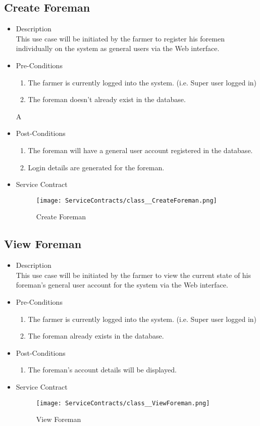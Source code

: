 \documentclass[11pt,fleqn]{book} %
\begin{document}
\subsection{Create Foreman}
\begin{itemize}
	\item Description\\
	This use case will be initiated by the farmer to register his foremen individually on the system as general users via the Web interface.
	\item Pre-Conditions
	\begin{enumerate}
		\item The farmer is currently logged into the system. (i.e. Super user logged in)
		\item The foreman doesn’t already exist in the database.
	\end{enumerate}A
	\item Post-Conditions
	\begin{enumerate}
		\item The foreman will have a general user account registered in the database.
		\item Login details are generated for the foreman.				
	\end{enumerate}
	\item Service Contract
	\begin{figure}
		\texttt{[image: ServiceContracts/class\_\_CreateForeman.png]}
		\caption{Create Foreman}
	\end{figure}
\end{itemize}

\subsection{View Foreman}
\begin{itemize}
	\item Description\\
	This use case will be initiated by the farmer to view the current state of his foreman’s general user account for the system via the Web interface.
	\item Pre-Conditions
	\begin{enumerate}
		\item The farmer is currently logged into the system. (i.e. Super user logged in)
		\item The foreman already exists in the database.					
	\end{enumerate}
	\item Post-Conditions
	\begin{enumerate}
		\item The foreman’s account details will be displayed.
	\end{enumerate}
	\item Service Contract
	\begin{figure}
		\texttt{[image: ServiceContracts/class\_\_ViewForeman.png]}
		\caption{View Foreman}
	\end{figure}
\end{itemize}
\end{document}

